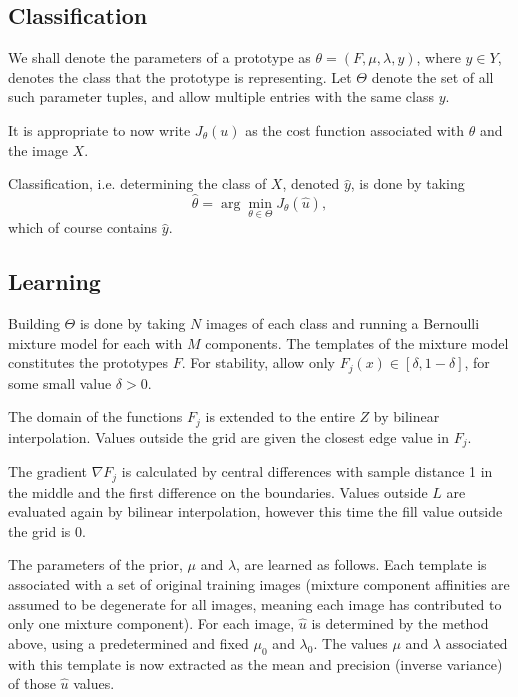 \documentclass{article}
\begin{document}

\subsection{Classification}

We shall denote the parameters of a prototype as $\theta = (F, \mu, \lambda, y)$, where $y \in Y$, denotes the class that the prototype is representing. Let $\Theta$ denote the set of all such parameter tuples, and allow multiple entries with the same class $y$.

It is appropriate to now write $J_{\theta}(u)$ as the cost function associated with $\theta$ and the image $X$.

Classification, i.e. determining the class of $X$, denoted $\hat y$, is done by taking
\[
    \hat \theta = \arg\min_{\theta \in \Theta} J_{\theta}(\hat u),
\]
which of course contains $\hat y$.



\subsection{Learning}

Building $\Theta$ is done by taking $N$ images of each class and running a Bernoulli mixture model for each with $M$ components. The templates of the mixture model constitutes the prototypes $F$. For stability, allow only $F_j(x) \in [\delta, 1-\delta]$, for some small value $\delta > 0$. 

The domain of the functions $F_j$ is extended to the entire $Z$ by bilinear interpolation. Values outside the grid are given the closest edge value in $F_j$.

The gradient $\nabla F_j$ is calculated by central differences with sample distance 1 in the middle and the first difference on the boundaries. Values outside $L$ are evaluated again by bilinear interpolation, however this time the fill value outside the grid is 0.

The parameters of the prior, $\mu$ and $\lambda$, are learned as follows. Each template is associated with a set of original training images (mixture component affinities are assumed to be degenerate for all images, meaning each image has contributed to only one mixture component). For each image, $\hat u$ is determined by the method above, using a predetermined and fixed $\mu_0$ and $\lambda_0$. The values $\mu$ and $\lambda$ associated with this template is now extracted as the mean and precision (inverse variance) of those $\hat u$ values.
\end{document}
